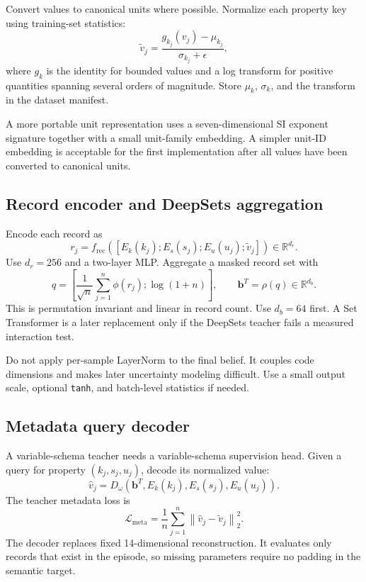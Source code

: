 \documentclass[11pt]{article}
\newcommand{\bvec}{\bm b}
\newcommand{\R}{\mathbb R}
\begin{document}
Convert values to canonical units where possible.  Normalize each property key
using training-set statistics:
\begin{equation}
  \widetilde v_j=\frac{g_{k_j}(v_j)-\mu_{k_j}}{\sigma_{k_j}+\epsilon},
  \label{eq:value-normalize}
\end{equation}
where $g_k$ is the identity for bounded values and a log transform for positive
quantities spanning several orders of magnitude.  Store $\mu_k$, $\sigma_k$,
and the transform in the dataset manifest.

A more portable unit representation uses a seven-dimensional SI exponent
signature together with a small unit-family embedding.  A simpler unit-ID
embedding is acceptable for the first implementation after all values have
been converted to canonical units.

\subsection{Record encoder and DeepSets aggregation}

Encode each record as
\begin{equation}
  r_j=f_{\mathrm{rec}}\!\left(
  [E_k(k_j);E_s(s_j);E_u(u_j);\widetilde v_j]
  \right)\in\R^{d_r}.
  \label{eq:record-encoder}
\end{equation}
Use $d_r=256$ and a two-layer MLP.  Aggregate a masked record set with
\begin{equation}
  q=\left[
  \frac{1}{\sqrt{n}}\sum_{j=1}^{n}\phi(r_j);
  \log(1+n)
  \right],
  \qquad
  \bvec^T=\rho(q)\in\R^{d_b}.
  \label{eq:deepsets}
\end{equation}
This is permutation invariant and linear in record count.  Use $d_b=64$ first.
A Set Transformer is a later replacement only if the DeepSets teacher fails a
measured interaction test.

Do not apply per-sample LayerNorm to the final belief.  It couples code
dimensions and makes later uncertainty modeling difficult.  Use a small output
scale, optional \texttt{tanh}, and batch-level statistics if needed.

\subsection{Metadata query decoder}

A variable-schema teacher needs a variable-schema supervision head.  Given a
query for property $(k_j,s_j,u_j)$, decode its normalized value:
\begin{equation}
  \widehat v_j=D_\omega\!\left(
  \bvec^T,E_k(k_j),E_s(s_j),E_u(u_j)
  \right).
  \label{eq:query-decoder}
\end{equation}
The teacher metadata loss is
\begin{equation}
  \mathcal L_{\mathrm{meta}}
  =\frac{1}{n}\sum_{j=1}^{n}
  \left\lVert\widehat v_j-\widetilde v_j\right\rVert_2^2.
  \label{eq:meta-loss}
\end{equation}
The decoder replaces fixed 14-dimensional reconstruction.  It evaluates only
records that exist in the episode, so missing parameters require no padding in
the semantic target.
\end{document}

